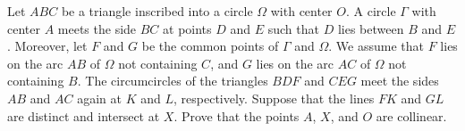 Let $ABC$ be a triangle inscribed into a circle $\Omega$ with center $O$. A circle $\Gamma$ with center $A$ meets the side $BC$ at points $D$ and $E$ such that $D$ lies between $B$ and $E$. Moreover, let $F$ and $G$ be the common points of $\Gamma$ and $\Omega$. We assume that $F$ lies on the arc $AB$ of $\Omega$ not containing $C$, and $G$ lies on the arc $AC$ of $\Omega$ not containing $B$. The circumcircles of the triangles $BDF$ and $CEG$ meet the sides $AB$ and $AC$ again at $K$ and $L$, respectively. Suppose that the lines $FK$ and $GL$ are distinct and intersect at $X$. Prove that the points $A$, $X$, and $O$ are collinear.
